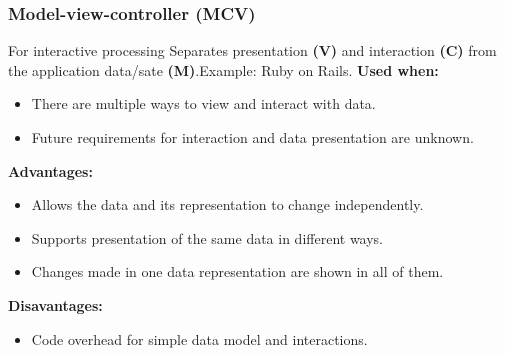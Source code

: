\documentclass[../ESOF_notes.tex]{subfiles}
\begin{document}
\subsubsection{Model-view-controller (MCV)}
For interactive processing
Separates presentation \textbf{(V)} and interaction \textbf{(C)} from the application data/sate \textbf{(M)}.\newline Example: Ruby on Rails.\newline\newline
\textbf{Used when:}
\begin{itemize}
    \item There are multiple ways to view and interact with data.
    \item Future requirements for interaction and data presentation are unknown.
\end{itemize} \textbf{Advantages:}
\begin{itemize}
    \item Allows the data and its representation to change independently.
    \item Supports presentation of the same data in different ways.
    \item Changes made in one data representation are shown in all of them.
\end{itemize}
\textbf{Disavantages:}
\begin{itemize}
    \item Code overhead for simple data model and interactions.
\end{itemize}
\end{document}
